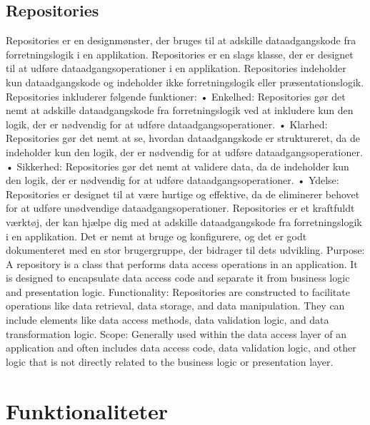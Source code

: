 \subsection{Repositories}
Repositories er en designmønster, der bruges til at adskille dataadgangskode fra forretningslogik i en applikation. Repositories er en slags klasse, der er designet til at udføre dataadgangsoperationer i en applikation. Repositories indeholder kun dataadgangskode og indeholder ikke forretningslogik eller præsentationslogik.
Repositories inkluderer følgende funktioner:
•	Enkelhed: Repositories gør det nemt at adskille dataadgangskode fra forretningslogik ved at inkludere kun den logik, der er nødvendig for at udføre dataadgangsoperationer.
•	Klarhed: Repositories gør det nemt at se, hvordan dataadgangskode er struktureret, da de indeholder kun den logik, der er nødvendig for at udføre dataadgangsoperationer.
•	Sikkerhed: Repositories gør det nemt at validere data, da de indeholder kun den logik, der er nødvendig for at udføre dataadgangsoperationer.
•	Ydelse: Repositories er designet til at være hurtige og effektive, da de eliminerer behovet for at udføre unødvendige dataadgangsoperationer.
Repositories er et kraftfuldt værktøj, der kan hjælpe dig med at adskille dataadgangskode fra forretningslogik i en applikation. Det er nemt at bruge og konfigurere, og det er godt dokumenteret med en stor brugergruppe, der bidrager til dets udvikling.
Purpose: A repository is a class that performs data access operations in an application. It is designed to encapsulate data access code and separate it from business logic and presentation logic.
Functionality: Repositories are constructed to facilitate operations like data retrieval, data storage, and data manipulation. They can include elements like data access methods, data validation logic, and data transformation logic.
Scope: Generally used within the data access layer of an application and often includes data access code, data validation logic, and other logic that is not directly related to the business logic or presentation layer.

\section{Funktionaliteter}
